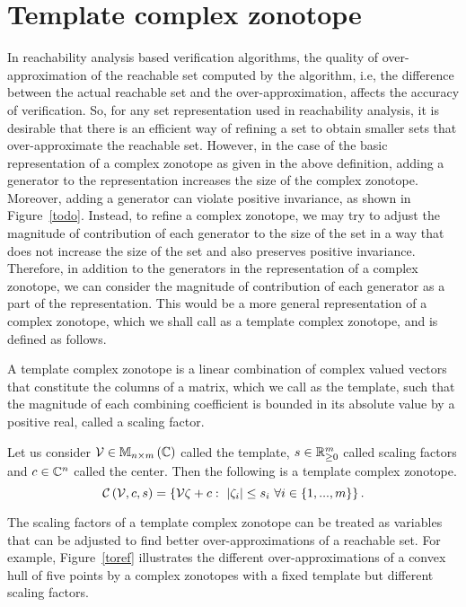 \section{Template complex zonotope}
In reachability analysis based verification algorithms, the quality of
over-approximation of the reachable set computed by the algorithm, i.e,
the difference between the actual reachable set and the
over-approximation, affects the accuracy of verification.  So, for any
set representation used in reachability analysis, it is desirable that
there is an efficient way of refining a set to obtain smaller sets
that over-approximate the reachable set.  However, in the case of the
basic representation of a complex zonotope as given in the above
definition, adding a generator to the representation increases the
size of the complex zonotope.  Moreover, adding a generator can
violate positive invariance, as shown in Figure~\ref{todo}.  Instead,
to refine a complex zonotope, we may try to adjust the magnitude of
contribution of each generator to the size of the set in a way that
does not increase the size of the set and also preserves positive
invariance.  Therefore, in addition to the generators in the
representation of a complex zonotope, we can consider the magnitude of
contribution of each generator as a part of the representation.  This
would be a more general representation of a complex zonotope, which we
shall call as a template complex zonotope, and is defined as follows.

A template complex zonotope is a linear combination of complex valued
vectors that constitute the columns of a matrix, which we call as the
template, such that the magnitude of each combining coefficient is
bounded in its absolute value by a positive real, called a scaling factor.
%
\begin{definition}
Let us consider $\mathcal{V}\in\mathbb{M}_{n\times m}\left(\mathbb{C}\right)$ called the template,
$s\in\mathbb{R}^m_{\geq 0}$ called scaling factors and
$c\in\mathbb{C}^n$ called the center.  Then the following is a template
complex zonotope.
%
\begin{equation}
\mathit{\mathcal{C}}\left(\mathcal{V},c,s\right)
= \left\{\mathcal{V}\zeta+c:~\left|\zeta_i\right|\leq s_i~\forall
i\in\left\{1,...,m\right\}\right\}.
\end{equation}
\end{definition}
%
The scaling factors of a template complex zonotope can be treated as
variables that can be adjusted to find better over-approximations of a
reachable set.  For example, Figure~\ref{toref} illustrates the
different over-approximations of a convex hull of five points by a
complex zonotopes with a fixed template but different scaling factors.
%
